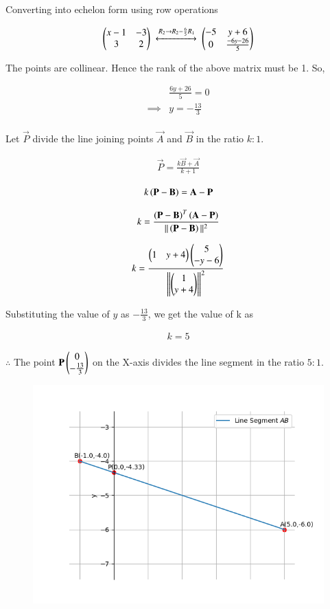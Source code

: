 \documentclass[journal]{IEEEtran}
\begin{document}
Converting into echelon form using row operations

\begin{align}
    \begin{pmatrix}x-1 & -3 \\ 3 & 2\end{pmatrix}\ \xleftrightarrow[]{R_2 \to R_2-\frac{6}{5}R_1} \  \begin{pmatrix}-5 & y+6 \\ 0 & \frac{-6y-26}{5}\end{pmatrix}
\end{align}

The points are collinear. Hence the rank of the above matrix must be 1. So, 

\begin{align}
    &\frac{6y+26}{5} = 0\\
    \implies& y=-\frac{13}{3}
\end{align}\\

Let $\vec{P}$ divide the line joining points $\vec{A}$ and $\vec{B}$ in the ratio $k:1$. 

\begin{align}
    \vec{P}=\frac{k\vec{B}+\vec{A}}{k+1}
\end{align}

\begin{align}
    k\left(\mathbf{P}- \mathbf{B}\right) = \mathbf{A}-\mathbf{P}
\end{align}

\begin{align}
    k=\frac{\left(\mathbf{P}-\mathbf{B}\right)^T\left(\mathbf{A}-\mathbf{P}\right)}{||\left(\mathbf{P}-\mathbf{B}\right)||^2}
\end{align}

\begin{align}
      k=\frac{\begin{pmatrix}1 & y+4\end{pmatrix}\begin{pmatrix}5\\-y-6\end{pmatrix}}{{\left\lVert\begin{pmatrix}1 \\ y+4\end{pmatrix}\right\rVert}^2}
\end{align}

Substituting the value of $y$ as $-\frac{13}{3}$, we get the value of k as

\begin{align}
    k=5
\end{align}

$\therefore$ The point $\mathbf{P}\begin{pmatrix}0\\-\frac{13}{3}\end{pmatrix}$ on the X-axis divides the line segment in the ratio $5:1$. 

\begin{figure}[h]
    \centering
    \includegraphics[width=1\columnwidth]{Figs/plot(py).png}
\end{figure}
\end{document}
